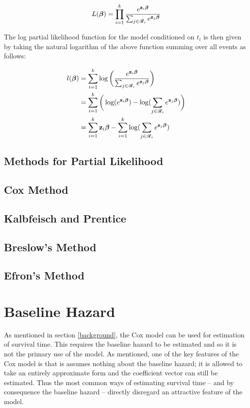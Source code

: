 \begin{equation}
    L(\boldsymbol{\beta}) = \prod_{i=1}^k \frac{e^{\textbf{z}_i\boldsymbol{\beta}}}{\sum_{j\in\mathscr{R}_i}e^{\textbf{z}_j\boldsymbol{\beta}}}
\end{equation}

The log partial likelihood function for the model conditioned on ${t_i}$ is then given by taking the natural logarithm of the above function summing over all events as follows:

\begin{align}
    l(\boldsymbol{\beta}) &= \sum_{i=1}^k \log\bigg(\frac{e^{\textbf{z}_i\boldsymbol{\beta}}}{\sum_{j\in\mathscr{R}_i}e^{\textbf{z}_j\boldsymbol{\beta}}}\bigg)\\
    &= \sum_{i=1}^k \bigg( \log(e^{\textbf{z}_i\boldsymbol{\beta}}) - \log(\sum_{j\in\mathscr{R}_i}e^{\textbf{z}_j\boldsymbol{\beta}})\bigg)\\
    &= \sum_{i=1}^k \textbf{z}_i\boldsymbol{\beta} - \sum_{i=1}^k \log(\sum_{j\in\mathscr{R}_i}e^{\textbf{z}_j\boldsymbol{\beta}})
\end{align}



\subsection{Methods for Partial Likelihood}
\subsection{Cox Method}
\subsection{Kalbfeisch and Prentice}
\subsection{Breslow's Method}
\subsection{Efron's Method}

\newpage
\section{Baseline Hazard}\label{baseline}

As mentioned in section \ref{background}, the Cox model can be used for estimation of survival time. This requires the baseline hazard to be estimated and so it is not the primary use of the model. As mentioned, one of the key features of the Cox model is that is assumes nothing about the baseline hazard; it is allowed to take an entirely approximate form and the coefficient vector can still be estimated. Thus the most common ways of estimating survival time -- and by consequence the baseline hazard -- directly disregard an attractive feature of the model.

